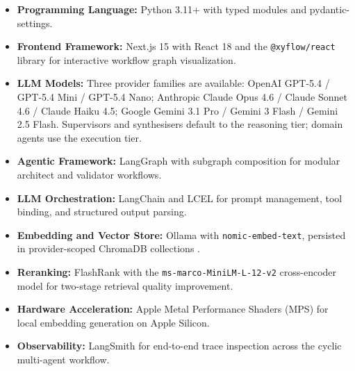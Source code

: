 \begin{itemize}
    \item \textbf{Programming Language:} Python 3.11+ with typed modules and pydantic-settings.
    \item \textbf{Frontend Framework:} Next.js 15 with React 18 and the \texttt{@xyflow/react} library for interactive workflow graph visualization.
    \item \textbf{LLM Models:} Three provider families are available: OpenAI GPT-5.4 / GPT-5.4 Mini / GPT-5.4 Nano; Anthropic Claude Opus 4.6 / Claude Sonnet 4.6 / Claude Haiku 4.5; Google Gemini 3.1 Pro / Gemini 3 Flash / Gemini 2.5 Flash. Supervisors and synthesisers default to the reasoning tier; domain agents use the execution tier.
    \item \textbf{Agentic Framework:} LangGraph \cite{langgraph2024docs} with subgraph composition for modular architect and validator workflows.
    \item \textbf{LLM Orchestration:} LangChain \cite{langchain2024docs} and LCEL \cite{langchain2024lcel} for prompt management, tool binding, and structured output parsing.
    \item \textbf{Embedding and Vector Store:} Ollama \cite{ollama2024web} with \texttt{nomic-embed-text}, persisted in provider-scoped ChromaDB collections \cite{chromadb2024}.
    \item \textbf{Reranking:} FlashRank with the \texttt{ms-marco-MiniLM-L-12-v2} cross-encoder model for two-stage retrieval quality improvement.
    \item \textbf{Hardware Acceleration:} Apple Metal Performance Shaders (MPS) \cite{apple2024mps} for local embedding generation on Apple Silicon.
    \item \textbf{Observability:} LangSmith for end-to-end trace inspection across the cyclic multi-agent workflow.
\end{itemize}

